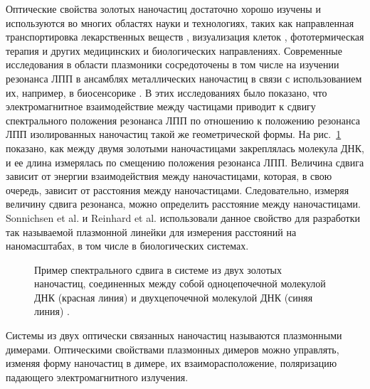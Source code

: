 Оптические свойства золотых наночастиц достаточно хорошо изучены и используются во многих областях науки и технологиях, таких как направленная транспортировка лекарственных веществ \cite{drugDelivery}, визуализация клеток \cite{cellImaging}, фототермическая терапия \cite{photothermalTherapy} и других медицинских и биологических направлениях. Современные исследования в области плазмоники сосредоточены в том числе на изучении резонанса ЛПП в ансамблях металлических наночастиц в связи с использованием их, например, в биосенсорике \cite{biosensing}. В этих исследованиях было показано, что электромагнитное взаимодействие между частицами приводит к сдвигу спектрального положения резонанса ЛПП по отношению к положению резонанса ЛПП изолированных наночастиц такой же геометрической формы. На рис.~\ref{img:bioDNA} показано, как между двумя золотыми наночастицами закреплялась молекула ДНК, и ее длина измерялась по смещению положения резонанса ЛПП. Величина сдвига зависит от энергии взаимодействия между наночастицами, которая, в свою очередь, зависит от расстояния между наночастицами. Следовательно, измеряя величину сдвига резонанса, можно определить расстояние между наночастицами. Sonnichsen et al. \cite{bioplasmonruler} и Reinhard et al. \cite{bioplasmonruler2} использовали данное свойство для разработки так называемой  плазмонной линейки для измерения расстояний на наномасштабах, в том числе в биологических системах.
\begin{figure}[h]
\caption{Пример спектрального сдвига в системе из двух золотых наночастиц, соединенных между собой одноцепочечной молекулой ДНК (красная линия) и двухцепочечной молекулой ДНК (синяя линия) \cite{biosensing}.}
\label{img:bioDNA}
\end{figure}
Системы из двух оптически связанных наночастиц называются плазмонными димерами. Оптическими свойствами плазмонных димеров можно управлять, изменяя форму наночастиц в димере, их взаиморасположение, поляризацию падающего электромагнитного излучения.

